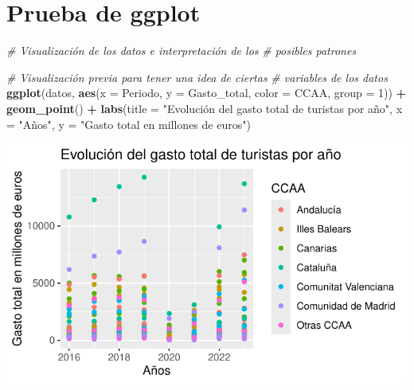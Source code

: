 \documentclass[data,article,submit,moreauthors,pdftex]{Definitions/mdpi}
\newenvironment{Shaded}{\begin{snugshade}}{\end{snugshade}}
\newcommand{\AttributeTok}[1]{\textcolor[rgb]{0.13,0.29,0.53}{#1}}
\newcommand{\CommentTok}[1]{\textcolor[rgb]{0.56,0.35,0.01}{\textit{#1}}}
\newcommand{\DecValTok}[1]{\textcolor[rgb]{0.00,0.00,0.81}{#1}}
\newcommand{\FunctionTok}[1]{\textcolor[rgb]{0.13,0.29,0.53}{\textbf{#1}}}
\newcommand{\NormalTok}[1]{#1}
\newcommand{\SpecialCharTok}[1]{\textcolor[rgb]{0.81,0.36,0.00}{\textbf{#1}}}
\newcommand{\StringTok}[1]{\textcolor[rgb]{0.31,0.60,0.02}{#1}}
\begin{document}
\section{Prueba de ggplot}\label{prueba-de-ggplot}

\begin{Shaded}
\begin{Highlighting}[]
\CommentTok{\# Visualización de los datos e interpretación de los}
\CommentTok{\# posibles patrones}

\CommentTok{\# Visualización previa para tener una idea de ciertas}
\CommentTok{\# variables de los datos}
\FunctionTok{ggplot}\NormalTok{(datos, }\FunctionTok{aes}\NormalTok{(}\AttributeTok{x =}\NormalTok{ Periodo, }\AttributeTok{y =}\NormalTok{ Gasto\_total, }\AttributeTok{color =}\NormalTok{ CCAA,}
    \AttributeTok{group =} \DecValTok{1}\NormalTok{)) }\SpecialCharTok{+} \FunctionTok{geom\_point}\NormalTok{() }\SpecialCharTok{+} \FunctionTok{labs}\NormalTok{(}\AttributeTok{title =} \StringTok{"Evolución del gasto total de turistas por año"}\NormalTok{,}
    \AttributeTok{x =} \StringTok{"Años"}\NormalTok{, }\AttributeTok{y =} \StringTok{"Gasto total en millones de euros"}\NormalTok{)}
\end{Highlighting}
\end{Shaded}

\includegraphics{ProyectoAED2024_Rmd_files/figure-latex/unnamed-chunk-27-1.pdf}
\end{document}
